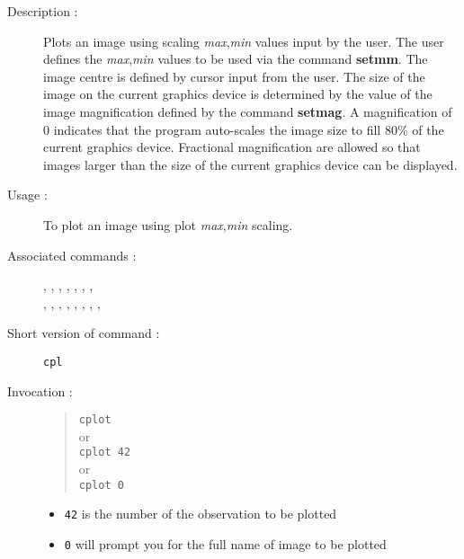 \begin{description}

\item[Description :] Plots an image using scaling {\it max},{\it min}
values input by the user.  The user defines the {\it max},{\it min}
values to be used via the command {\bf setmm}.  The image centre is
defined by cursor input from the user.  The size of the image on the
current graphics device is determined by the value of the image
magnification defined by the command {\bf setmag}.  A magnification of
0 indicates that the program auto-scales the image size to fill 80\% of
the current graphics device.  Fractional magnification are allowed so
that images larger than the size of the current graphics device can be
displayed.

\item[Usage :] To plot an image using plot {\it max},{\it min} scaling.

\item[Associated commands :] {\tt {}}, 
{\tt {}}, {\tt {}}, 
{\tt {}}, {\tt {}}, 
{\tt {}}, {\tt {}}, \\ 
{\tt {}}, {\tt {}}, 
{\tt {}}, {\tt {}}, 
{\tt {}}, {\tt {}}, 
{\tt {}}, {\tt {}}, 
{\tt {}}

\item[Short version of command :] {\tt cpl}
\item[Invocation :]

\begin{quote}{\tt  cplot }\\
or \\
{\tt cplot 42 }\\
or\\ 
{\tt cplot 0 }
\end{quote}

\begin{itemize}

\item {\tt 42} is the number of the observation to be plotted
\item {\tt 0} will prompt you for the full name of image to be plotted
\end{itemize}

\end{description}

